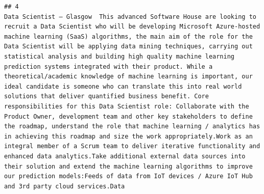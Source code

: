 \documentclass[
]{article}
\begin{document}
\begin{verbatim}
## 4                                                                                                                                                                                                                                                                                                                                                                                                                                                                                                                                                                                                                                                                                                                                                                                                                                                                                                                                                                                                                                                                                                                                                                                                                                                                                                                                                                                                                                                                                                                                                                                                                                                                                                                                                                                                                                                                                                                                                                                                                                                                                                                                                                                                                    Data Scientist – Glasgow  This advanced Software House are looking to recruit a Data Scientist who will be developing Microsoft Azure-hosted machine learning (SaaS) algorithms, the main aim of the role for the Data Scientist will be applying data mining techniques, carrying out statistical analysis and building high quality machine learning prediction systems integrated with their product. While a theoretical/academic knowledge of machine learning is important, our ideal candidate is someone who can translate this into real world solutions that deliver quantified business benefit. Core responsibilities for this Data Scientist role: Collaborate with the Product Owner, development team and other key stakeholders to define the roadmap, understand the role that machine learning / analytics has in achieving this roadmap and size the work appropriately.Work as an integral member of a Scrum team to deliver iterative functionality and enhanced data analytics.Take additional external data sources into their solution and extend the machine learning algorithms to improve our prediction models:Feeds of data from IoT devices / Azure IoT Hub and 3rd party cloud services.Data 
\end{verbatim}
\end{document}
